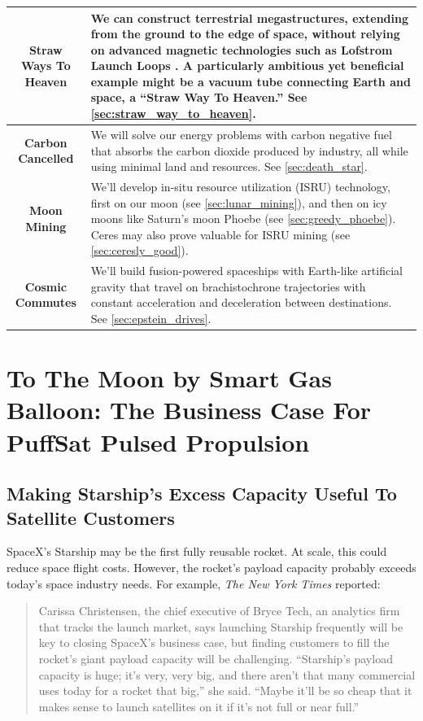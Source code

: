 \documentclass{article}
\begin{document}
\begin{table}[!htpb]
\begin{tabularx}{\textwidth}{|c|L|}
        \textbf{Straw Ways To Heaven} & We can construct terrestrial megastructures, extending from the ground to the edge of space, without relying on advanced magnetic technologies such as Lofstrom Launch Loops \cite{lofstrom_loop}. A particularly ambitious yet beneficial example might be a vacuum tube connecting Earth and space, a ``Straw Way To Heaven.'' See \autoref{sec:straw_way_to_heaven}.\\\hline
        \textbf{Carbon Cancelled} & We will solve our energy problems with carbon negative fuel that absorbs the carbon dioxide produced by industry, all while using minimal land and resources.  See \autoref{sec:death_star}.\\\hline
        \textbf{Moon Mining} & We'll develop in-situ resource utilization (ISRU) technology, first on our moon (see \autoref{sec:lunar_mining}),  and then on icy moons like Saturn's moon Phoebe (see \autoref{sec:greedy_phoebe}).  Ceres may also prove valuable for ISRU mining (see \autoref{sec:ceresly_good}).\\\hline
        \textbf{Cosmic Commutes} & We'll build fusion-powered spaceships with Earth-like artificial gravity that travel on brachistochrone trajectories with constant acceleration and deceleration between destinations.  See \autoref{sec:epstein_drives}.\\\hline
    \end{tabularx}
\end{table}

\section{To The Moon by Smart Gas Balloon:  The Business Case For PuffSat Pulsed Propulsion}\label{sec:business_case}

\subsection{Making Starship's Excess Capacity Useful To Satellite Customers} \label{sec:starship_safelaunch}

SpaceX's Starship may be the first fully reusable rocket. At scale, this could reduce space flight costs.   However, the rocket's payload capacity probably exceeds today's space industry needs. For example, \textit{The New York Times} reported:

\begin{quote}
Carissa Christensen, the chief executive of Bryce Tech, an analytics firm that tracks the launch market, says launching Starship frequently will be key to closing SpaceX's business case, but finding customers to fill the rocket's giant payload capacity will be challenging. 
``Starship's payload capacity is huge; it's very, very big, and there aren't that many commercial uses today for a rocket that big,'' she said.  ``Maybe it'll be so cheap that it makes sense to launch satellites on it if it's not full or near full.''  \cite{nyt_starship_size}
\end{quote}
\end{document}
